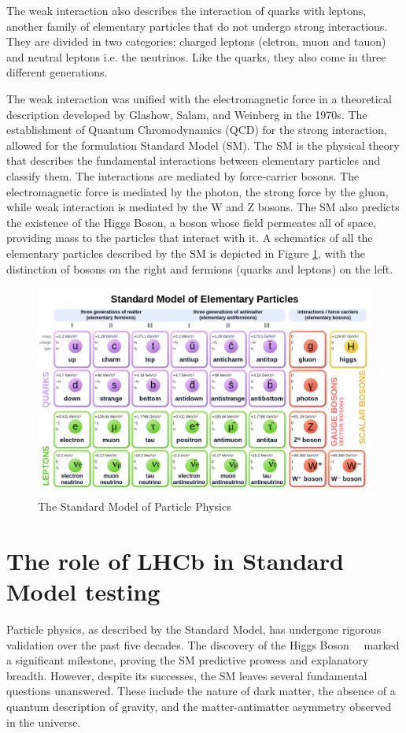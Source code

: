 The weak interaction also describes the interaction of quarks with leptons, another family of elementary particles that do not undergo strong interactions. They are divided in two categories: charged leptons (eletron, muon and tauon) and neutral leptons i.e. the neutrinos. Like the quarks, they also come in three different generations.  

The weak interaction was unified with the electromagnetic force in a theoretical description developed by Glashow, Salam, and Weinberg in the 1970s. The establishment of Quantum Chromodynamics (QCD) for the strong interaction, allowed for the formulation Standard Model (SM). The SM is the physical theory that describes the fundamental interactions between elementary particles and classify them. The interactions are mediated by force-carrier bosons. The electromagnetic force is mediated by the photon, the strong force by the gluon, while weak interaction is mediated by the W and Z bosons. The SM also predicts the existence of the Higgs Boson, a boson whose field permeates all of space, providing mass to the particles that interact with it. A schematics of all the elementary particles described by the SM is depicted in Figure \ref{fig:SM}, with the distinction of bosons on the right and fermions (quarks and leptons) on the left. 

\begin{figure}
    \centering
    \includegraphics[width=\textwidth]{figures/Standard_Model_of_Elementary_Particles_Anti.svg.png}
    \caption{The Standard Model of Particle Physics}
    \label{fig:SM}
\end{figure}


\section{The role of LHCb in Standard Model testing}
Particle physics, as described by the Standard Model, has undergone rigorous validation over the past five decades. The discovery of the Higgs Boson~~\cite{Aad_2012, Chatrchyan_2012} marked a significant milestone, proving the SM predictive prowess and explanatory breadth. However, despite its successes, the SM leaves several fundamental questions unanswered. These include the nature of dark matter, the absence of a quantum description of gravity, and the matter-antimatter asymmetry observed in the universe.


